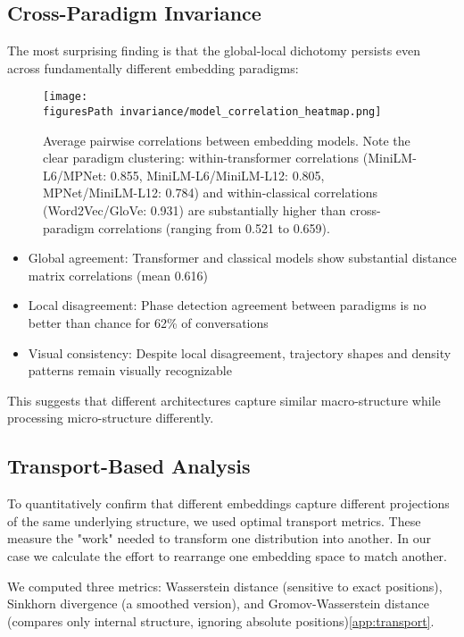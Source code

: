 \documentclass[11pt,letterpaper]{article}
\newcommand{\crossParadigmCorr}{0.616}
\newcommand{\figuresPath}{../analysis/analysis_output/figures/}
\begin{document}
\subsection{Cross-Paradigm Invariance}

The most surprising finding is that the global-local dichotomy persists even across fundamentally different embedding paradigms:

\begin{figure}[H]
\centering
\texttt{[image: \\figuresPath invariance/model\_correlation\_heatmap.png]}
\caption{Average pairwise correlations between embedding models. Note the clear paradigm clustering: within-transformer correlations (MiniLM-L6/MPNet: 0.855, MiniLM-L6/MiniLM-L12: 0.805, MPNet/MiniLM-L12: 0.784) and within-classical correlations (Word2Vec/GloVe: 0.931) are substantially higher than cross-paradigm correlations (ranging from 0.521 to 0.659).}
\label{fig:pairwise}
\end{figure}

\begin{itemize}
\item Global agreement: Transformer and classical models show substantial distance matrix correlations (mean \crossParadigmCorr{})
\item Local disagreement: Phase detection agreement between paradigms is no better than chance for 62\% of conversations
\item Visual consistency: Despite local disagreement, trajectory shapes and density patterns remain visually recognizable
\end{itemize}

This suggests that different architectures capture similar macro-structure while processing micro-structure differently.

\subsection{Transport-Based Analysis}

To quantitatively confirm that different embeddings capture different projections of the same underlying structure, we used optimal transport metrics. These measure the "work" needed to transform one distribution into another. In our case we calculate the effort to rearrange one embedding space to match another.

We computed three metrics: Wasserstein distance (sensitive to exact positions), Sinkhorn divergence (a smoothed version), and Gromov-Wasserstein distance (compares only internal structure, ignoring absolute positions)\ref{app:transport}.
\end{document}
